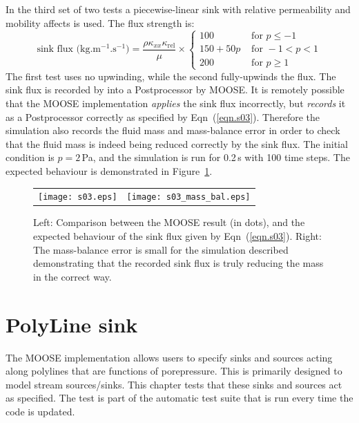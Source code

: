 \documentclass[]{scrreprt}
\begin{document}
\noindent In the third set of two tests a piecewise-linear sink with relative
permeability and mobility affects is used.  The flux strength is:
\begin{equation}
\mbox{sink flux (kg.m$^{-1}$.s$^{-1}$)} = 
\frac{\rho\kappa_{xx}\kappa_{\mathrm{rel}}}{\mu}
\times \left\{
\begin{array}{ll}
100 & \mbox{ for } p \leq -1 \\
150+50p& \mbox{ for } -1<p<1 \\
200 & \mbox{ for } p\geq 1 
\end{array}
\right.
\label{eqn.s03}
\end{equation}
The first test uses no upwinding, while the second fully-upwinds the flux.
The sink flux is recorded by into a Postprocessor by MOOSE.  It is
remotely possible that the MOOSE implementation {\em applies} the sink
flux incorrectly, but {\em records} it as a Postprocessor correctly as
specified by Eqn~(\ref{eqn.s03}).  Therefore the simulation also
records the fluid mass and mass-balance error in order to check that
the fluid mass is indeed being reduced correctly by the sink flux.
The initial condition is $p=2$\,Pa, and the simulation is run for
0.2\,s with 100 time steps.  The expected behaviour is demonstrated in
Figure~\ref{s03.fig}.

\begin{figure}[htb]
\centering
\begin{tabular}{cc}
\texttt{[image: s03.eps]} &
\texttt{[image: s03\_mass\_bal.eps]}
\end{tabular}
\caption{Left: Comparison between the MOOSE result (in dots), and the
  expected behaviour of the sink flux given by Eqn~(\ref{eqn.s03}).
  Right: The mass-balance error is small for the simulation described
  demonstrating that the recorded sink flux is truly reducing the mass
  in the correct way.}
\label{s03.fig}
\end{figure}


\chapter{PolyLine sink}
\label{st}

The MOOSE implementation allows users to specify sinks and sources
acting along polylines that are functions of porepressure.  This is
primarily designed to model stream sources/sinks.  This chapter
tests that these sinks and sources act as specified.  The test is
part of the automatic test suite that is run every time the code is
updated.
\end{document}
